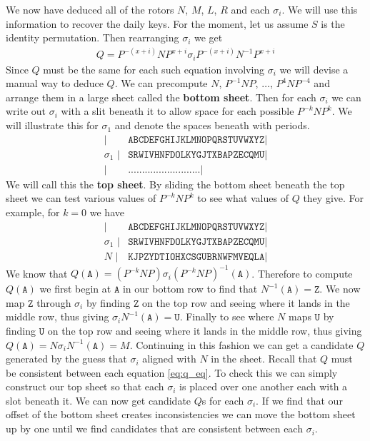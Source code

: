 We now have deduced all of the rotors $N$, $M$, $L$, $R$ and each $\sigma_i$. We will use this information to recover the daily keys. For the moment, let us assume $S$ is the identity permutation. Then rearranging $\sigma_i$ we get
\begin{align}
	Q = P^{-(x+i)}NP^{x+i}\sigma_iP^{-(x+i)}N^{-1}P^{x+i} \label{eq:q_eq}
\end{align}
Since $Q$ must be the same for each such equation involving $\sigma_i$ we will devise a manual way to deduce $Q$. We can precompute $N$, $P^{-1}NP$, $\dots$, $P^{4}NP^{-4}$ and arrange them in a large sheet called the {\bf{bottom sheet}}.
Then for each $\sigma_i$ we can write out $\sigma_i$ with a slit beneath it to allow space for each possible $P^{-k}NP^k$. We will illustrate this for $\sigma_1$ and denote the spaces beneath with periods.
\begin{align*}
	\texttt{|}          & \texttt{ABCDEFGHIJKLMNOPQRSTUVWXYZ} \texttt{|} \\
	\sigma_1\texttt{ |} & \texttt{SRWIVHNFDOLKYGJTXBAPZECQMU} \texttt{|} \\
	\texttt{|}          & \texttt{..........................} \texttt{|}
\end{align*}
We will call this the {\bf{top sheet}}. By sliding the bottom sheet beneath the top sheet we can test various values of $P^{-k}NP^{k}$ to see what values of $Q$ they give. For example, for $k = 0$ we have
\begin{align*}
	\texttt{|}          & \texttt{ABCDEFGHIJKLMNOPQRSTUVWXYZ} \texttt{|} \\
	\sigma_1\texttt{ |} & \texttt{SRWIVHNFDOLKYGJTXBAPZECQMU} \texttt{|} \\
	N \texttt{ |}       & \texttt{KJPZYDTIOHXCSGUBRNWFMVEQLA} \texttt{|}
\end{align*}
We know that $Q(\texttt{A}) = (P^{-k}NP)\sigma_i(P^{-k}NP)^{-1}(\texttt{A})$. Therefore to compute $Q(\texttt{A})$ we first begin at $\texttt{A}$ in our bottom row to find that $N^{-1}(\texttt{A})=\texttt{Z}$. We now map $\texttt{Z}$ through $\sigma_i$ by finding $\texttt{Z}$ on the top row and seeing where it lands in the middle row, thus giving $\sigma_iN^{-1}(\texttt{A}) = \texttt{U}$. Finally to see where $N$ maps $\texttt{U}$ by finding $\texttt{U}$ on the top row and seeing where it lands in the middle row, thus giving $Q(\texttt{A}) = N\sigma_iN^{-1}(\texttt{A}) = M$. Continuing in this fashion we can get a candidate $Q$ generated by the guess that $\sigma_i$ aligned with $N$ in the sheet. Recall that $Q$ must be consistent between each equation \ref{eq:q_eq}. To check this we can simply construct our top sheet so that each $\sigma_i$ is placed over one another each with a slot beneath it. We can now get candidate $Q$s for each $\sigma_i$. If we find that our offset of the bottom sheet creates inconsistencies we can move the bottom sheet up by one until we find candidates that are consistent between each $\sigma_i$.
